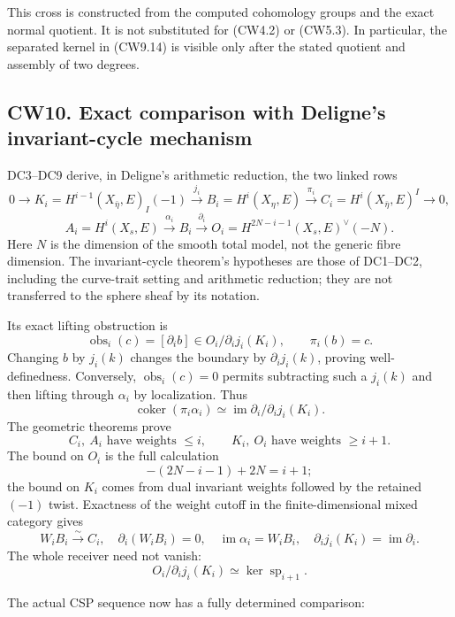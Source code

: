 This cross is constructed from the computed cohomology groups and the
exact normal quotient. It is not substituted for (CW4.2) or (CW5.3). In
particular, the separated kernel in (CW9.14) is visible only after the
stated quotient and assembly of two degrees.

\subsection{CW10. Exact comparison with Deligne's invariant-cycle
mechanism}\label{cw10.-exact-comparison-with-delignes-invariant-cycle-mechanism}

DC3--DC9 derive, in Deligne's arithmetic reduction, the two linked rows
\[
0\to K_i=H^{i-1}(X_{\bar\eta},E)_I(-1)
\xrightarrow{j_i}B_i=H^i(X_\eta,E)
\xrightarrow{\pi_i}C_i=H^i(X_{\bar\eta},E)^I\to0,
\] \[
A_i=H^i(X_s,E)\xrightarrow{\alpha_i}B_i
\xrightarrow{\partial_i}
O_i=H^{2N-i-1}(X_s,E)^\vee(-N).
\tag{CW10.1}
\] Here \(N\) is the dimension of the smooth total model, not the
generic fibre dimension. The invariant-cycle theorem's hypotheses are
those of DC1--DC2, including the curve-trait setting and arithmetic
reduction; they are not transferred to the sphere sheaf by its notation.

Its exact lifting obstruction is \[
\operatorname{obs}_i(c)=[\partial_i b]
\in O_i/\partial_i j_i(K_i),\qquad \pi_i(b)=c.
\tag{CW10.2}
\] Changing \(b\) by \(j_i(k)\) changes the boundary by
\(\partial_i j_i(k)\), proving well-definedness. Conversely,
\(\operatorname{obs}_i(c)=0\) permits subtracting such a \(j_i(k)\) and
then lifting through \(\alpha_i\) by localization. Thus \[
\operatorname{coker}(\pi_i\alpha_i)
\simeq\operatorname{im}\partial_i/\partial_i j_i(K_i).
\tag{CW10.3}
\] The geometric theorems prove \[
C_i,\ A_i\text{ have weights }\le i,\qquad
K_i,\ O_i\text{ have weights }\ge i+1.
\tag{CW10.4}
\] The bound on \(O_i\) is the full calculation \[
-(2N-i-1)+2N=i+1;
\] the bound on \(K_i\) comes from dual invariant weights followed by
the retained \((-1)\) twist. Exactness of the weight cutoff in the
finite-dimensional mixed category gives \[
W_iB_i\xrightarrow{\sim}C_i,\quad
\partial_i(W_iB_i)=0,\quad
\operatorname{im}\alpha_i=W_iB_i,\quad
\partial_i j_i(K_i)=\operatorname{im}\partial_i.
\tag{CW10.5}
\] The whole receiver need not vanish: \[
O_i/\partial_i j_i(K_i)\simeq\ker\operatorname{sp}_{i+1}.
\tag{CW10.6}
\]

The actual CSP sequence now has a fully determined comparison:

